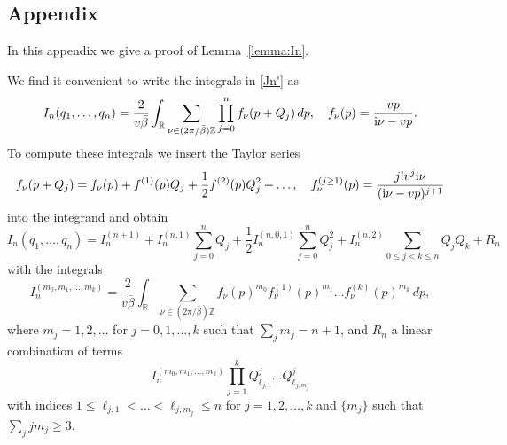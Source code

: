 \documentclass[12pt,a4paper]{article}
\renewcommand{\theequation}{\thesection.\arabic{equation}}
\newcommand{\ii}{{\rm i}}
\newcommand{\R}{\mathbb{R}}
\newcommand{\Z}{\mathbb{Z}}
\theoremstyle{definition}
\theoremstyle{remark}
\begin{document}
\begin{appendix}


\section*{Appendix}
\label{Sec:Appendix}
\renewcommand{\theequation}{A.\arabic{equation}}

In this appendix we give a proof of Lemma~\ref{lemma:In}.

We find it convenient to write the integrals in \eqref{Jn'} as
%
\begin{equation}
\label{Jn1}
I_n(q_1,\ldots,q_n) = \frac{2}{v\bar\beta} \int_{\R}
\sum_{\nu \in (2\pi/\bar\beta)\Z} \prod_{j=0}^n f_\nu(p+Q_j) \, dp,
\quad
f_\nu(p) = \frac{vp}{\ii\nu-vp}.
\end{equation} 
%
To compute these integrals we insert the Taylor series 
%
\begin{equation} 
\label{Taylor}
f_\nu(p+Q_j)
= f_\nu(p) + f^{(1)}(p)Q_j + \frac{1}{2} f^{(2)}(p)Q_j^2 + \ldots,
\quad
f_\nu^{(j\geq 1)}(p)
= \frac{j! v^{j} \ii\nu}{(\ii\nu-v p)^{j+1}}
\end{equation} 
%
into the integrand and obtain 
%
\begin{equation}
\label{Jn2} 
I_n(q_1,\ldots,q_n)
= I_n^{(n+1)}
	+ I_n^{(n,1)} \sum_{j=0}^nQ_j
	+ \frac{1}{2} I_n^{(n,0,1)} \sum_{j=0}^nQ_j^2
	+ I_n^{(n,2)} \sum_{0\leq j<k\leq n}Q_jQ_k
	+ R_n
\end{equation} 
%
with the integrals 
%
\begin{equation} 
\label{JnB} 
I_n^{(m_0,m_1,\ldots,m_k)}
= \frac{2}{v\bar\beta} \int_{\mathbb{R}}
	\sum_{\nu \in (2\pi/\bar\beta)\Z}
	f_\nu(p)^{m_0}f^{(1)}_\nu(p)^{m_1}\ldots f^{(k)}_\nu(p)^{m_k} \, dp,
\end{equation} 
%
where $m_j = 1,2,\ldots$ for $j=0,1,\ldots,k$ such that $\sum_{j} m_j = n+1$,
and $R_n$ a linear combination of terms
%
\begin{equation} 
\label{Rest} 
I_n^{(m_0,m_1,\ldots,m_k)}
\prod_{j=1}^{k} Q_{\ell_{j,1}}^{j} \ldots Q_{\ell_{j,m_j}}^{j} 
\end{equation} 
%
with indices $1\leq \ell_{j,1} < \ldots < \ell_{j,m_j}\leq n$ for $j = 1,2,\ldots,k$ and $\{ m_j \}$ such that $\sum_j jm_j\geq 3$.


\end{appendix}
\end{document}
